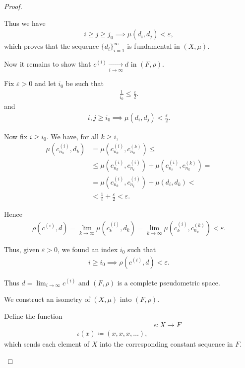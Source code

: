 \begin{proof}
\begin{defenum}
    Thus we have
    \begin{align*}
      i \geq j \geq j_0 \implies \mu(d_i, d_j) < \varepsilon,
    \end{align*}
    which proves that the sequence $\{ d_i \}_{i=1}^\infty$ is fundamental in $(X, \mu)$.

    Now it remains to show that $c^{(i)} \xrightarrow[i \to \infty]{} d$ in $(F, \rho)$.

    Fix $\varepsilon > 0$ and let $i_0$ be such that
    \begin{align*}
      \frac 1 {i_0} \leq \frac \varepsilon 2.
    \end{align*}
    and
    \begin{align*}
      i, j \geq i_0 \implies \mu(d_i, d_j) < \frac \varepsilon 2.
    \end{align*}

    Now fix $i \geq i_0$. We have, for all $k \geq i$,
    \begin{align*}
      \mu(c_{n_k}^{(i)}, d_k)
      &=
      \mu(c_{n_k}^{(i)}, c_{n_k}^{(k)})
      \leq \\ &\leq
      \mu(c_{n_k}^{(i)}, c_{n_i}^{(i)}) + \mu(c_{n_i}^{(i)}, c_{n_k}^{(k)})
      = \\ &=
      \mu(c_{n_k}^{(i)}, c_{n_i}^{(i)}) + \mu(d_i, d_k)
      < \\ &<
      \frac 1 i + \frac \varepsilon 2
      <
      \varepsilon.
    \end{align*}

    Hence
    \begin{align*}
      \rho(c^{(i)}, d)
      =
      \lim_{k \to \infty} \mu(c_k^{(i)}, d_k)
      =
      \lim_{k \to \infty} \mu(c_k^{(i)}, c_{n_k}^{(k)})
      <
      \varepsilon.
    \end{align*}

    Thus, given $\varepsilon > 0$, we found an index $i_0$ such that
    \begin{align*}
      i \geq i_0 \implies \rho(c^{(i)}, d) < \varepsilon.
    \end{align*}

    Thus $d = \lim_{i \to \infty} c^{(i)}$ and $(F, \rho)$ is a complete pseudometric space.

    \item\label{thm:metric_space_completion_existence/part_c} We construct an isometry of $(X, \mu)$ into $(F, \rho)$.

    Define the function
    \begin{align*}
      &e: X \to F \\
      \iota(x) \coloneqq (x, x, x, \ldots),
    \end{align*}
    which sends each element of $X$ into the corresponding constant sequence in $F$.


\end{defenum}
\end{proof}
